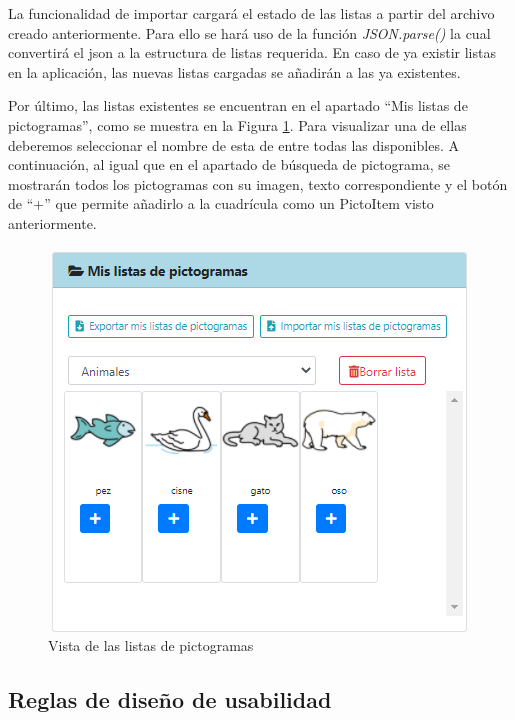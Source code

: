 La funcionalidad de importar cargará el estado de las listas a partir del archivo creado anteriormente. Para ello se hará uso de la función \textit{JSON.parse()} la cual convertirá el json a la estructura de listas requerida. En caso de ya existir listas en la aplicación, las nuevas listas cargadas se añadirán a las ya existentes. 

Por último, las listas existentes se encuentran en el apartado “Mis listas de pictogramas”, como se muestra en la Figura \ref{fig:lisapictosel}. Para visualizar una de ellas deberemos seleccionar el nombre de esta de entre todas las disponibles. A continuación, al igual que en el apartado de búsqueda de pictograma, se mostrarán todos los pictogramas con su imagen, texto correspondiente y el botón de “+” que permite añadirlo a la cuadrícula como un PictoItem visto anteriormente.

\begin{figure}[h!]
	\centering
	\includegraphics[width=0.7\linewidth]{Imagenes/Bitmap/lisaPictoSel}
	\caption{Vista de las listas de pictogramas}
	\label{fig:lisapictosel}
\end{figure}

\subsection{Reglas de diseño de usabilidad}


